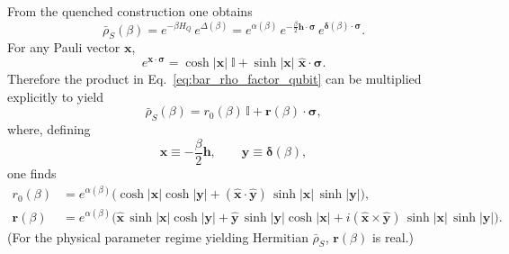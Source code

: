 From the quenched construction one obtains
\begin{equation}
    \bar\rho_S(\beta)
    =
    e^{-\beta H_Q}\,e^{\Delta(\beta)}
    =
    e^{\alpha(\beta)}\,
    e^{-\frac{\beta}{2}\mathbf h\cdot\boldsymbol\sigma}\,
    e^{\boldsymbol\delta(\beta)\cdot\boldsymbol\sigma}.
    \label{eq:bar_rho_factor_qubit}
\end{equation}
For any Pauli vector $\mathbf x$,
\begin{equation}
    e^{\mathbf x\cdot\boldsymbol\sigma}
    =
    \cosh|\mathbf x|\;\mathbb I
    +
    \sinh|\mathbf x|\;\hat{\mathbf x}\cdot\boldsymbol\sigma.
    \label{eq:pauli_exp}
\end{equation}
Therefore the product in Eq.~\eqref{eq:bar_rho_factor_qubit} can be multiplied explicitly to yield
\begin{equation}
    \bar\rho_S(\beta)=r_0(\beta)\,\mathbb I+\mathbf r(\beta)\cdot\boldsymbol\sigma,
\end{equation}
where, defining
\begin{equation}
    \mathbf x\equiv -\frac{\beta}{2}\mathbf h,
    \qquad
    \mathbf y\equiv \boldsymbol\delta(\beta),
\end{equation}
one finds
\begin{align}
    r_0(\beta)
    &=
    e^{\alpha(\beta)}\Big(\cosh|\mathbf x|\cosh|\mathbf y|
    +(\hat{\mathbf x}\cdot\hat{\mathbf y})\,\sinh|\mathbf x|\,\sinh|\mathbf y|\Big),
    \label{eq:r0_formula}\\
    \mathbf r(\beta)
    &=
    e^{\alpha(\beta)}\Big(
    \hat{\mathbf x}\,\sinh|\mathbf x|\cosh|\mathbf y|
    +\hat{\mathbf y}\,\sinh|\mathbf y|\cosh|\mathbf x|
    + i(\hat{\mathbf x}\times\hat{\mathbf y})\,\sinh|\mathbf x|\,\sinh|\mathbf y|
    \Big).
    \label{eq:rvec_formula}
\end{align}
(For the physical parameter regime yielding Hermitian $\bar\rho_S$, $\mathbf r(\beta)$ is real.)


